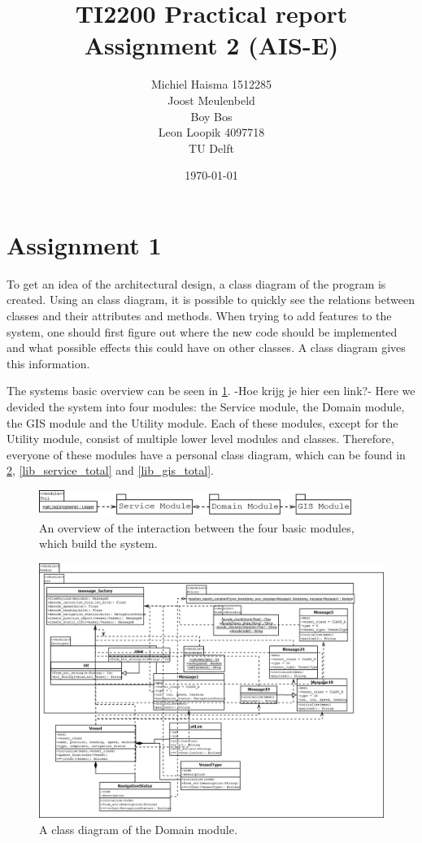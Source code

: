 \documentclass[12pt]{article}
\title{TI2200 Practical report\\
Assignment 2 (AIS-E)}
\author{Michiel Haisma 1512285\\
Joost Meulenbeld \\
Boy Bos\\
Leon Loopik 4097718\\
TU Delft\\}
\date{\today}
\begin{document}
\maketitle

\section*{Assignment 1}
To get an idea of the architectural design, a class diagram of the program is created. Using an class diagram, it is possible to quickly see the relations between classes and their attributes and methods. When trying to add features to the system, one should first figure out where the new code should be implemented and what possible effects this could have on other classes. A class diagram gives this information.

The systems basic overview can be seen in \ref{lib_total_overview}. -Hoe krijg je hier een link?- Here we devided the system into four modules: the Service module, the Domain module, the GIS module and the Utility module. Each of these modules, except for the Utility module, consist of multiple lower level modules and classes. Therefore, everyone of these modules have a personal class diagram, which can be found in \ref{lib_domain_total}, \ref{lib_service_total} and \ref{lib_gis_total}.

\begin{figure}
  \label{lib_total_overview}
  \centering
  \includegraphics[width=4in]{lib_total_overview}
  \caption[The four basic modules]
   {An overview of the interaction between the four basic modules, which build the system.}
\end{figure}

\begin{figure}
  \label{lib_domain_total}
  \centering
  \includegraphics[width=5in]{lib_domain_total}
  \caption[The Domain module]
   {A class diagram of the Domain module.}
\end{figure}
\end{document}
